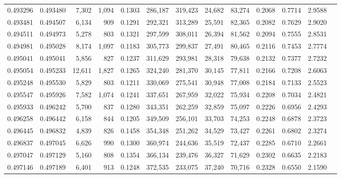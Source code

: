 \begin{tabular}{rrrrrrrrrrrrr}
0.493296 & 0.493480 &  7,302 & 1,094 &                                     0.1303 & 286,187 & 319,423 &  24,682 &  83,274 & 0.2068 & 0.7714 & 2.9588 \\
0.493481 & 0.494507 &  6,134 &   909 &                                     0.1291 & 292,321 & 313,289 &  25,591 &  82,365 & 0.2082 & 0.7629 & 2.9020 \\
0.494511 & 0.494973 &  5,278 &   803 &                                     0.1321 & 297,599 & 308,011 &  26,394 &  81,562 & 0.2094 & 0.7555 & 2.8531 \\
0.494981 & 0.495028 &  8,174 & 1,097 &                                     0.1183 & 305,773 & 299,837 &  27,491 &  80,465 & 0.2116 & 0.7453 & 2.7774 \\
0.495041 & 0.495041 &  5,856 &   827 &                                     0.1237 & 311,629 & 293,981 &  28,318 &  79,638 & 0.2132 & 0.7377 & 2.7232 \\
0.495054 & 0.495233 & 12,611 & 1,827 &                                     0.1265 & 324,240 & 281,370 &  30,145 &  77,811 & 0.2166 & 0.7208 & 2.6063 \\
0.495248 & 0.495530 &  5,829 &   803 &                                     0.1211 & 330,069 & 275,541 &  30,948 &  77,008 & 0.2184 & 0.7133 & 2.5523 \\
0.495547 & 0.495926 &  7,582 & 1,074 &                                     0.1241 & 337,651 & 267,959 &  32,022 &  75,934 & 0.2208 & 0.7034 & 2.4821 \\
0.495933 & 0.496242 &  5,700 &   837 &                                     0.1280 & 343,351 & 262,259 &  32,859 &  75,097 & 0.2226 & 0.6956 & 2.4293 \\
0.496258 & 0.496442 &  6,158 &   844 &                                     0.1205 & 349,509 & 256,101 &  33,703 &  74,253 & 0.2248 & 0.6878 & 2.3723 \\
0.496445 & 0.496832 &  4,839 &   826 &                                     0.1458 & 354,348 & 251,262 &  34,529 &  73,427 & 0.2261 & 0.6802 & 2.3274 \\
0.496837 & 0.497045 &  6,626 &   990 &                                     0.1300 & 360,974 & 244,636 &  35,519 &  72,437 & 0.2285 & 0.6710 & 2.2661 \\
0.497047 & 0.497129 &  5,160 &   808 &                                     0.1354 & 366,134 & 239,476 &  36,327 &  71,629 & 0.2302 & 0.6635 & 2.2183 \\
0.497146 & 0.497189 &  6,401 &   913 &                                     0.1248 & 372,535 & 233,075 &  37,240 &  70,716 & 0.2328 & 0.6550 & 2.1590 \\

\end{tabular}
